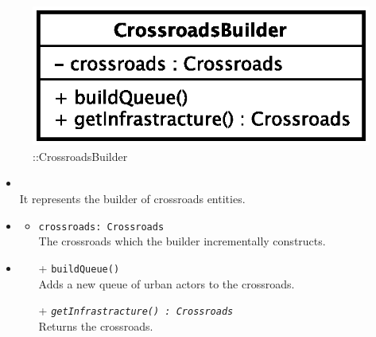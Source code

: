 \begin{figure}[h]
\centering
\includegraphics[scale=0.6,keepaspectratio]{images/solution/app/backend/crossroads_builder.eps}
\caption{\pReactiveBuild::CrossroadsBuilder}
\label{fig:sd-app-crossroads_builder}
\end{figure}
\FloatBarrier
\begin{itemize}
  \item \textbf{\descr} \\
    It represents the builder of crossroads entities. 
    \item \textbf{\attrs}
  \begin{itemize}
    \item \texttt{crossroads: Crossroads} \\
The crossroads which the builder incrementally constructs.
  \end{itemize}
  \item \textbf{\ops}
  \begin{itemize} 
    \item[+] \texttt{buildQueue()} \\
Adds a new queue of urban actors to the crossroads.
    \item[+] \texttt{\textit{getInfrastracture() : Crossroads}} \\
Returns the crossroads.
  \end{itemize}
\end{itemize}
